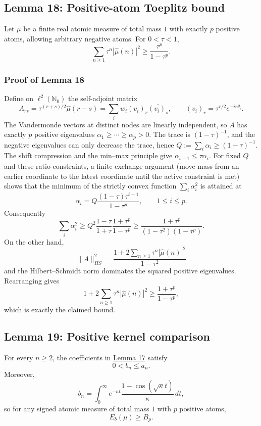 \documentclass[11pt]{article}
\begin{document}
\subsection{Lemma 18: Positive-atom Toeplitz
bound}\label{lem-toeplitz-positive-atoms}

Let \(\mu\) be a finite real atomic measure of total mass \(1\) with
exactly \(p\) positive atoms, allowing arbitrary negative atoms. For
\(0<\tau<1\), \[
\sum_{n\ge1}\tau^n|\widehat\mu(n)|^2\ge\frac{\tau^p}{1-\tau^p}.
\]

\subsubsection{Proof of Lemma
18}\label{proof-lem-toeplitz-positive-atoms}

Define on \(\ell^2(\mathbb N_0)\) the self-adjoint matrix \[
A_{rs}=\tau^{(r+s)/2}\widehat\mu(r-s)=\sum_iw_i(v_i)_r\overline{(v_i)_s},
\qquad (v_i)_r=\tau^{r/2}e^{-ir\theta_i}.
\] The Vandermonde vectors at distinct nodes are linearly independent,
so \(A\) has exactly \(p\) positive eigenvalues
\(\alpha_1\ge\cdots\ge\alpha_p>0\). The trace is \((1-\tau)^{-1}\), and
the negative eigenvalues can only decrease the trace, hence
\(Q:=\sum_i\alpha_i\ge(1-\tau)^{-1}\). The shift compression and the
min--max principle give \(\alpha_{i+1}\le\tau\alpha_i\). For fixed \(Q\)
and these ratio constraints, a finite exchange argument (move mass from
an earlier coordinate to the latest coordinate until the active
constraint is met) shows that the minimum of the strictly convex
function \(\sum_i\alpha_i^2\) is attained at \[
\alpha_i=Q\frac{(1-\tau)\tau^{i-1}}{1-\tau^p},\qquad 1\le i\le p.
\] Consequently \[
\sum_i\alpha_i^2\ge Q^2\frac{1-\tau}{1+\tau}\frac{1+\tau^p}{1-\tau^p}
\ge\frac{1+\tau^p}{(1-\tau^2)(1-\tau^p)}.
\] On the other hand, \[
\|A\|_{HS}^2=\frac{1+2\sum_{n\ge1}\tau^n|\widehat\mu(n)|^2}{1-\tau^2}
\] and the Hilbert--Schmidt norm dominates the squared positive
eigenvalues. Rearranging gives \[
1+2\sum_{n\ge1}\tau^n|\widehat\mu(n)|^2\ge\frac{1+\tau^p}{1-\tau^p},
\] which is exactly the claimed bound.

\subsection{Lemma 19: Positive kernel
comparison}\label{lem-kernel-comparison}

For every \(n\ge2\), the coefficients in
\hyperref[lem-spectral-core]{Lemma 17} satisfy \[
0<b_n\le a_n.
\] Moreover, \[
b_n=\int_0^\infty e^{-nt}\frac{1-\cos(\sqrt\kappa t)}\kappa\,dt,
\] so for any signed atomic measure of total mass \(1\) with \(p\)
positive atoms, \[
E_b(\mu)\ge B_p.
\]
\end{document}
